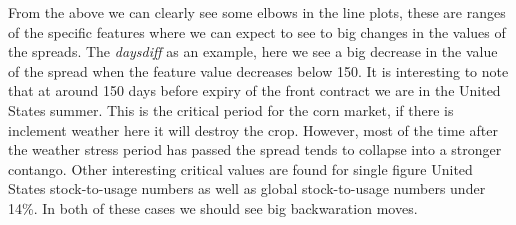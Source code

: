 \documentclass[
]{book}
\begin{document}
From the above we can clearly see some elbows in the line plots, these are ranges of the specific features where we can expect to see to big changes in the values of the spreads. The \emph{daysdiff} as an example, here we see a big decrease in the value of the spread when the feature value decreases below 150. It is interesting to note that at around 150 days before expiry of the front contract we are in the United States summer. This is the critical period for the corn market, if there is inclement weather here it will destroy the crop. However, most of the time after the weather stress period has passed the spread tends to collapse into a stronger contango. Other interesting critical values are found for single figure United States stock-to-usage numbers as well as global stock-to-usage numbers under 14\%. In both of these cases we should see big backwaration moves.

  
\end{document}
